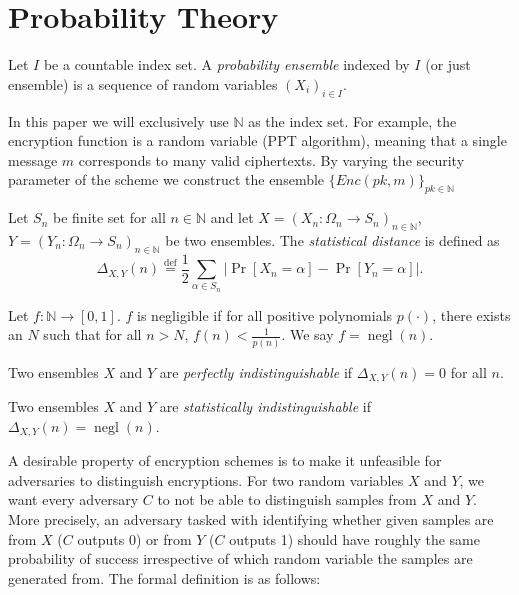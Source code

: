 \section{Probability Theory}
\begin{definition}
    Let $I$ be a countable index set. A \textit{probability ensemble} indexed by $I$ (or just ensemble) is a sequence of random variables $(X_i)_{i \in I}$.
\end{definition}
In this paper we will exclusively use $\mathbb{N}$ as the index set.
For example, the encryption function is a random variable (PPT algorithm), meaning that a single message $m$ corresponds to many valid ciphertexts. By varying the security parameter of the scheme we construct the ensemble $\{Enc(pk,m)\}_{pk \in \mathbb{N}}$
\begin{definition}
    Let $S_n$ be finite set for all $n \in \mathbb{N}$ and let $X = (X_n \colon \Omega_n \to S_n)_{n \in \mathbb{N}}$, $Y = (Y_n \colon \Omega_n \to S_n)_{n \in \mathbb{N}}$ be two ensembles. The \textit{statistical distance} is defined as
    \begin{equation*}
        \Delta_{X,Y}(n) \stackrel{\mathrm{def}}{=} \frac{1}{2} \sum_{\alpha \in S_n} |\operatorname{Pr}[X_n = \alpha] - \operatorname{Pr}[Y_n = \alpha]|.
    \end{equation*}
\end{definition}
\begin{definition}
    Let $f \colon \mathbb{N} \to [0,1]$. $f$ is negligible if for all positive polynomials $p(\cdot)$, there exists an $N$ such that for all $n>N$, $f(n) < \frac{1}{p(n)}$. We say $f = \operatorname{negl}(n)$.
\end{definition}
\begin{definition}
    Two ensembles $X$ and $Y$ are \textit{perfectly indistinguishable} if $\Delta_{X,Y}(n) = 0$ for all $n$.
\end{definition}
\begin{definition}
    Two ensembles $X$ and $Y$ are \textit{statistically indistinguishable} if $\Delta_{X,Y}(n) = \operatorname{negl}(n)$.
\end{definition}
 A desirable property of encryption schemes is to make it unfeasible for adversaries to distinguish encryptions. For two random variables $X$ and $Y$, we want every adversary $C$ to not be able to distinguish samples from $X$ and $Y$. More precisely, an adversary tasked with identifying whether given samples are from $X$ ($C$ outputs 0) or from $Y$ ($C$ outputs 1) should have roughly the same probability of success irrespective of which random variable the samples are generated from. The formal definition is as follows:
